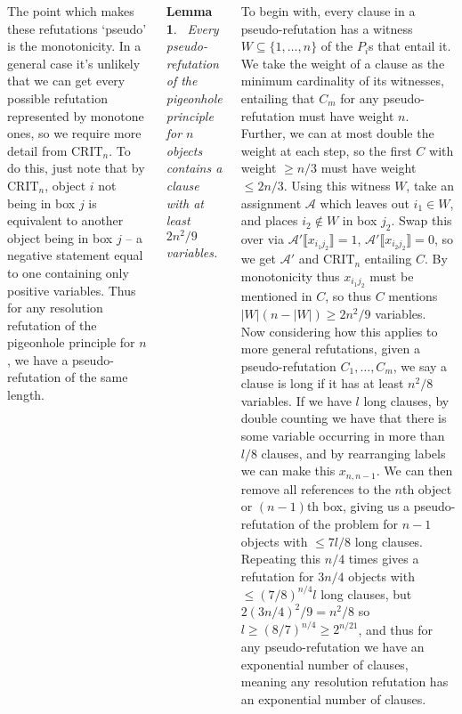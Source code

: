 \documentclass{tikzposter} %
\newtheorem{lemma}[theorem]{Lemma}
\newtheorem{definition}{Definition}
\begin{document}
\begin{columns}
{{      The point which makes these refutations `pseudo' is the monotonicity. In a general case it's unlikely that we can get every possible refutation represented by monotone ones, so we require more detail from $\mathrm{CRIT}_{n}$. To do this, just note that by $\mathrm{CRIT}_{n}$, object $i$ not being in box $j$ is equivalent to another object being in box $j$ -- a negative statement equal to one containing only positive variables. Thus for any resolution refutation of the pigeonhole principle for $n$, we have a pseudo-refutation of the same length. \\

      \begin{lemma}
      \ Every pseudo-refutation of the pigeonhole principle for $n$ objects contains a clause with at least $2n^{2}/9$ variables.
      \end{lemma}
      \hphantom{}

      To begin with, every clause in a pseudo-refutation has a witness $W \subseteq \{1,\dots,n\}$ of the $P_{i}$s that entail it. We take the weight of a clause as the minimum cardinality of its witnesses, entailing that $C_{m}$ for any pseudo-refutation must have weight $n$. Further, we can at most double the weight at each step, so the first $C$ with weight $\ge n/3$ must have weight $\le 2n/3$. Using this witness $W$, take an assignment $\mathcal{A}$ which leaves out $i_{1} \in W$, and places $i_{2} \notin W$ in box $j_{2}$. Swap this over via $\mathcal{A}' \llbracket x_{i_{1}j_{2}} \rrbracket = 1$, $\mathcal{A}' \llbracket x_{i_{2}j_{2}} \rrbracket = 0$, so we get $\mathcal{A}'$ and $\mathrm{CRIT}_{n}$ entailing $C$. By monotonicity thus $x_{i_{1}j_{2}}$ must be mentioned in $C$, so thus $C$ mentions $|W|(n-|W|) \ge 2n^{2}/9$ variables. \\

      Now considering how this applies to more general refutations, given a pseudo-refutation $C_{1},\dots,C_{m}$, we say a clause is long if it has at least $n^{2}/8$ variables. If we have $l$ long clauses, by double counting we have that there is some variable occurring in more than $l/8$ clauses, and by rearranging labels we can make this $x_{n,n-1}$. We can then remove all references to the $n$th object or $(n-1)$th box, giving us a pseudo-refutation of the problem for $n-1$ objects with $ \le 7l/8$ long clauses. Repeating this $n/4$ times gives a refutation for $3n/4$ objects with $\le (7/8)^{n/4} l$ long clauses, but $2(3n/4)^{2}/9 = n^{2}/8$ so $l \ge (8/7)^{n/4} \ge 2^{n/21}$, and thus for any pseudo-refutation we have an exponential number of clauses, meaning any resolution refutation has an exponential number of clauses.
    }
  }
\end{columns}
\end{document}

